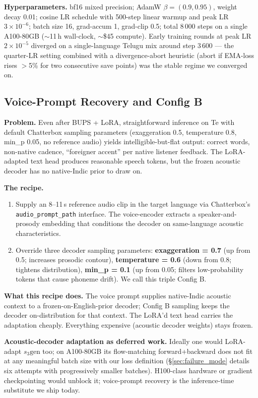 \documentclass[conference,a4paper]{IEEEtran}
\newcommand{\bups}{\textsc{BUPS}}
\newcommand{\configb}{Config B}
\begin{document}
\textbf{Hyperparameters.} bf16 mixed precision; AdamW $\beta=(0.9,0.95)$, weight decay 0.01; cosine LR schedule with 500-step linear warmup and peak LR $3\times10^{-6}$; batch size 16, grad-accum 1, grad-clip 0.5; total 8\,000 steps on a single A100-80GB ($\sim$11\,h wall-clock, $\sim$\$45 compute). Early training rounds at peak LR $2\times10^{-5}$ diverged on a single-language Telugu mix around step 3\,600 --- the quarter-LR setting combined with a divergence-abort heuristic (abort if EMA-loss rises $>$5\% for two consecutive save points) was the stable regime we converged on. 
\subsection{Voice-Prompt Recovery and \configb}
\label{sec:configb}

\textbf{Problem.} Even after \bups{} + LoRA, straightforward inference on Te with default Chatterbox sampling parameters (exaggeration 0.5, temperature 0.8, min\_p 0.05, no reference audio) yields intelligible-but-flat output: correct words, non-native cadence, ``foreigner accent'' per native listener feedback. The LoRA-adapted text head produces reasonable speech tokens, but the frozen acoustic decoder has no native-Indic prior to draw on.

\textbf{The recipe.}
\begin{enumerate}
  \item Supply an 8--11\,s reference audio clip in the target language via Chatterbox's \texttt{audio\_prompt\_path} interface. The voice-encoder extracts a speaker-and-prosody embedding that conditions the decoder on same-language acoustic characteristics.
  \item Override three decoder sampling parameters: \textbf{exaggeration = 0.7} (up from 0.5; increases prosodic contour), \textbf{temperature = 0.6} (down from 0.8; tightens distribution), \textbf{min\_p = 0.1} (up from 0.05; filters low-probability tokens that cause phoneme drift). We call this triple \configb.
\end{enumerate}

\textbf{What this recipe does.} The voice prompt supplies native-Indic acoustic context to a frozen-on-English-prior decoder; \configb{} sampling keeps the decoder on-distribution for that context. The LoRA'd text head carries the adaptation cheaply. Everything expensive (acoustic decoder weights) stays frozen.

\textbf{Acoustic-decoder adaptation as deferred work.} Ideally one would LoRA-adapt $s_3\text{gen}$ too; on A100-80GB its flow-matching forward+backward does not fit at any meaningful batch size with our loss definition (§\ref{sec:failure_mode} details six attempts with progressively smaller batches). H100-class hardware or gradient checkpointing would unblock it; voice-prompt recovery is the inference-time substitute we ship today.
\end{document}
